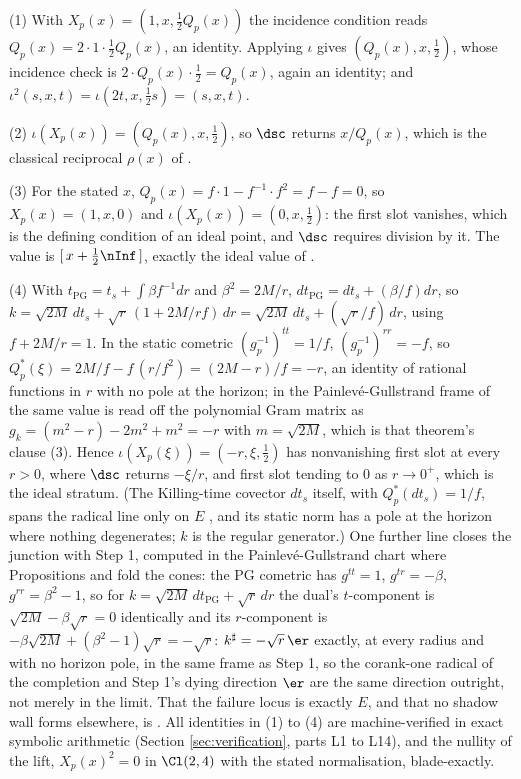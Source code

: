 (1) With $X_p(x) = (1, x, \tfrac12 Q_p(x))$ the incidence condition reads $Q_p(x) = 2 \cdot 1 \cdot \tfrac12 Q_p(x)$, an identity. Applying $\iota$ gives $(Q_p(x), x, \tfrac12)$, whose incidence check is $2 \cdot Q_p(x) \cdot \tfrac12 = Q_p(x)$, again an identity; and $\iota^2(s,x,t) = \iota(2t, x, \tfrac12 s) = (s, x, t)$.

(2) $\iota(X_p(x)) = (Q_p(x), x, \tfrac12)$, so $\dsc$ returns $x/Q_p(x)$, which is the classical reciprocal $\rho(x)$ of \cite[Lem.~4.23(2)]{ButlerT1}.

(3) For the stated $x$, $Q_p(x) = f \cdot 1 - f^{-1} \cdot f^2 = f - f = 0$, so $X_p(x) = (1, x, 0)$ and $\iota(X_p(x)) = (0, x, \tfrac12)$: the first slot vanishes, which is the defining condition of an ideal point, and $\dsc$ requires division by it. The value is $[\,x + \tfrac12 \nInf\,]$, exactly the ideal value of \cite[Thm.~4.10(3)]{ButlerT1}.

(4) With $t_{\mathrm{PG}} = t_s + \int \beta f^{-1}dr$ and $\beta^{2} = 2M/r$, $dt_{\mathrm{PG}} = dt_s + (\beta/f)dr$, so $k = \sqrt{2M}\,dt_s + \sqrt r\,(1 + 2M/rf)\,dr = \sqrt{2M}\,dt_s + (\sqrt r/f)\,dr$, using $f + 2M/r = 1$. In the static cometric $(g_p^{-1})^{tt} = 1/f$, $(g_p^{-1})^{rr} = -f$, so $Q^*_p(\xi) = 2M/f - f\,(r/f^{2}) = (2M - r)/f = -r$, an identity of rational functions in $r$ with no pole at the horizon; in the Painlev\'e-Gullstrand frame of \cite[Thm.~8.7]{ButlerT4} the same value is read off the polynomial Gram matrix as $g_k = (m^{2} - r) - 2m^{2} + m^{2} = -r$ with $m = \sqrt{2M}$, which is that theorem's clause (3). Hence $\iota(X_p(\xi)) = (-r, \xi, \tfrac12)$ has nonvanishing first slot at every $r > 0$, where $\dsc$ returns $-\xi/r$, and first slot tending to $0$ as $r \to 0^+$, which is the ideal stratum. (The Killing-time covector $dt_s$ itself, with $Q^*_p(dt_s) = 1/f$, spans the radical line only on $E$ \cite[Thm.~8.7(4)]{ButlerT4}, and its static norm has a pole at the horizon where nothing degenerates; $k$ is the regular generator.) One further line closes the junction with Step 1, computed in the Painlev\'e-Gullstrand chart where Propositions  and  fold the cones: the PG cometric has $g^{tt} = 1$, $g^{tr} = -\beta$, $g^{rr} = \beta^{2} - 1$, so for $k = \sqrt{2M}\,dt_{\mathrm{PG}} + \sqrt r\,dr$ the dual's $t$-component is $\sqrt{2M} - \beta\sqrt r = 0$ identically and its $r$-component is $-\beta\sqrt{2M} + (\beta^{2} - 1)\sqrt r = -\sqrt r$: $k^{\sharp} = -\sqrt r\,\er$ exactly, at every radius and with no horizon pole, in the same frame as Step 1, so the corank-one radical of the completion and Step 1's dying direction $\er$ are the same direction outright, not merely in the limit. That the failure locus is exactly $E$, and that no shadow wall forms elsewhere, is \cite[Thm.~8.12]{ButlerT4}. All identities in (1) to (4) are machine-verified in exact symbolic arithmetic (Section \ref{sec:verification}, parts L1 to L14), and the nullity of the lift, $X_p(x)^{2} = 0$ in $\Cl(2,4)$ with the stated normalisation, blade-exactly.

